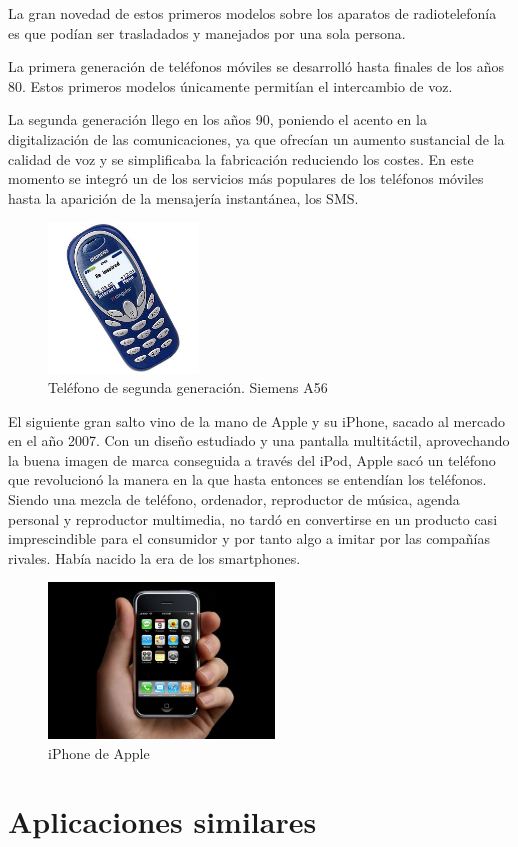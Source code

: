 La gran novedad de estos primeros modelos sobre los aparatos de radiotelefonía es que podían ser trasladados y manejados por una sola persona.

La primera generación de teléfonos móviles se desarrolló hasta finales de los años 80. Estos primeros modelos únicamente permitían el intercambio de voz.

La segunda generación llego en los años 90, poniendo el acento en la digitalización de las comunicaciones, ya que ofrecían un aumento sustancial de la calidad de voz y se simplificaba la fabricación reduciendo los costes. En este momento se integró un de los servicios más populares de los teléfonos móviles hasta la aparición de la mensajería instantánea, los \ac{SMS}.

\begin{figure}[h!btp]
\centering
\includegraphics[height=40mm, fbox={\fboxrule} 4mm]{images/03-antecedentes/29-siemens_a56.jpg}
\caption{Teléfono de segunda generación. Siemens A56}
\label{fig:siemens-a56}
\end{figure}

El siguiente gran salto vino de la mano de Apple y su iPhone, sacado al mercado en el año 2007. Con un diseño estudiado y una pantalla multitáctil, aprovechando la buena imagen de marca conseguida a través del iPod, Apple sacó un teléfono que revolucionó la manera en la que hasta entonces se entendían los teléfonos. Siendo una mezcla de teléfono, ordenador, reproductor de música, agenda personal y reproductor multimedia, no tardó en convertirse en un producto casi imprescindible para el consumidor y por tanto algo a imitar por las compañías rivales. Había nacido la era de los smartphones.

\begin{figure}[h!btp]
\centering
\includegraphics[width=60mm, fbox={\fboxrule} 4mm]{images/03-antecedentes/30-iphone.jpg}
\caption{iPhone de Apple}
\label{fig:iphone}
\end{figure}

\section{Aplicaciones similares}



